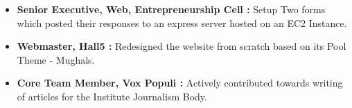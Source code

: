 
{\fontsize{11pt}{1em}\bodyfontlight\upshape\color{text}
  \begin{itemize}
			\item \textbf{Senior Executive, Web, Entrepreneurship Cell : }  Setup Two forms which posted their responses to an express server hosted on an EC2 Instance.
			\item \textbf{Webmaster, Hall5 : } Redesigned the website from scratch based on its Pool Theme - Mughals. 
			\item \textbf{Core Team Member, Vox Populi : } Actively contributed towards writing  of articles for the Institute Journalism Body. 
  \end{itemize}
}
